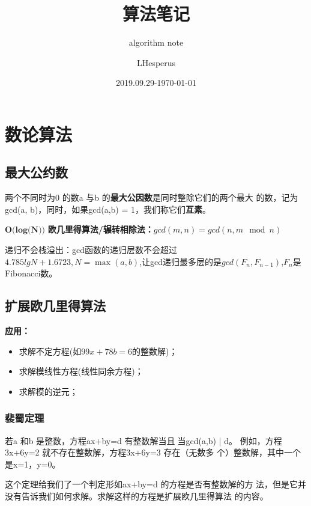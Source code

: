 \documentclass[lang=cn,11pt]{elegantbook}
\title{算法笔记}
\subtitle{algorithm note}
\author{LHesperus}
\institute{UESTC}
\date{2019.09.29-\today}
\begin{document}
	
	\maketitle
	\tableofcontents
	\mainmatter
	\hypersetup{pageanchor=true}
	\chapter{数论算法}
	\section{最大公约数}
	两个不同时为0 的数a 与b 的\textbf{最大公因数}是同时整除它们的两个最大
	的数，记为gcd(a, b)，同时，如果gcd(a,b) = 1，我们称它们\textbf{互素}。
	
$\textbf{O(log(N))}$	\textbf{欧几里得算法/辗转相除法：}$gcd(m,n) = gcd(n,m \mod n)$

递归不会栈溢出：gcd函数的递归层数不会超过$4.785lgN+1.6723,N=\max{(a,b)}$,让gcd递归最多层的是$gcd(F_{n},F_{n-1})$,$F_{n}$是Fibonacci数。
	\section{扩展欧几里得算法}
\textbf{应用：}
	\begin{itemize}
	\item 求解不定方程(如$99x+78b=6$的整数解)；
	
	\item 求解模线性方程(线性同余方程)；
	
	\item 求解模的逆元；
	\end{itemize}

	\subsection{裴蜀定理}
	若a 和b 是整数，方程ax+by=d 有整数解当且􂎑当gcd(a,b) | d。
	例如，方程3x+6y=2 就不存在整数解，方程3x+6y=3 存在（无数多
	个）整数解，其中一个是x=1，y=0。
	
	这个定理给我们了一个判定形如ax+by=d 的方程是否有整数解的方
	法，但是它并没有告诉我们如何求解。求解这样的方程是扩展欧几里得算法
	的内容。
	
\end{document}
